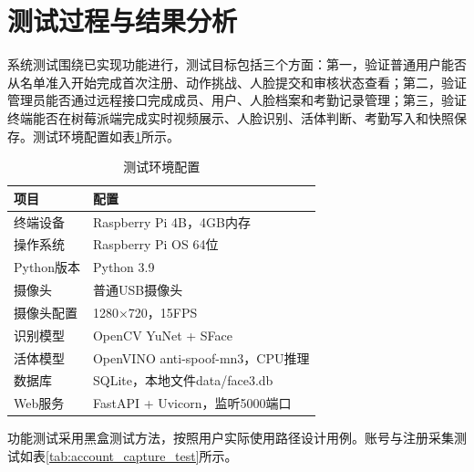 
\section{测试过程与结果分析}

系统测试围绕已实现功能进行，测试目标包括三个方面：第一，验证普通用户能否从名单准入开始完成首次注册、动作挑战、人脸提交和审核状态查看；第二，验证管理员能否通过远程接口完成成员、用户、人脸档案和考勤记录管理；第三，验证终端能否在树莓派端完成实时视频展示、人脸识别、活体判断、考勤写入和快照保存。测试环境配置如表\ref{tab:test_env}所示。

\begin{table}[H]
    \centering
    \caption{测试环境配置}
    \label{tab:test_env}
    \begin{tabularx}{\textwidth}{p{4cm}X}
        \toprule
        \textbf{项目} & \textbf{配置} \\
        \midrule
        终端设备 & Raspberry Pi 4B，4GB内存 \\
        操作系统 & Raspberry Pi OS 64位 \\
        Python版本 & Python 3.9 \\
        摄像头 & 普通USB摄像头 \\
        摄像头配置 & 1280$\times$720，15FPS \\
        识别模型 & OpenCV YuNet + SFace \\
        活体模型 & OpenVINO anti-spoof-mn3，CPU推理 \\
        数据库 & SQLite，本地文件data/face3.db \\
        Web服务 & FastAPI + Uvicorn，监听5000端口 \\
        \bottomrule
    \end{tabularx}
\end{table}

功能测试采用黑盒测试方法，按照用户实际使用路径设计用例。账号与注册采集测试如表\ref{tab:account_capture_test}所示。

